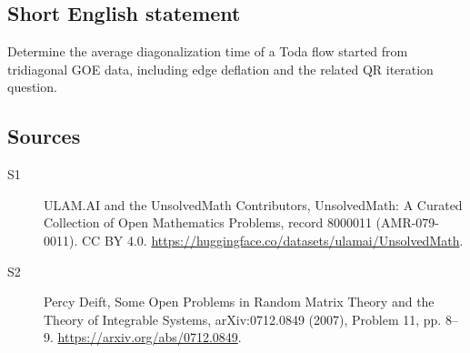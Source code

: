 \documentclass[11pt]{article}
\begin{document}
\subsection{Short English statement}
Determine the average diagonalization time of a Toda flow started from tridiagonal GOE data, including edge deflation and the related QR iteration question.
\subsection{Sources}
\begin{description}
\item[\hypertarget{source:8000011:1}{S1}] ULAM.AI and the UnsolvedMath Contributors, UnsolvedMath: A Curated Collection of Open Mathematics Problems, record 8000011 (AMR-079-0011). CC BY 4.0. \url{https://huggingface.co/datasets/ulamai/UnsolvedMath}.
\item[\hypertarget{source:8000011:2}{S2}] Percy Deift, Some Open Problems in Random Matrix Theory and the Theory of Integrable Systems, arXiv:0712.0849 (2007), Problem 11, pp. 8--9. \url{https://arxiv.org/abs/0712.0849}.
\end{description}
\label{end:8000011}
\end{document}
